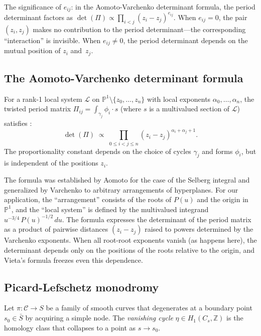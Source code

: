 \documentclass[11pt]{article}
\theoremstyle{plain}
\theoremstyle{definition}
\theoremstyle{remark}
\newcommand{\ZZ}{\mathbb{Z}}
\newcommand{\PP}{\mathbb{P}}
\begin{document}
The significance of $e_{ij}$: in the Aomoto-Varchenko determinant formula,
the period determinant factors as $\det(\Pi) \propto \prod_{i < j} (z_i - z_j)^{e_{ij}}$.
When $e_{ij} = 0$, the pair $(z_i, z_j)$ makes no contribution to the period
determinant---the corresponding ``interaction'' is invisible.  When $e_{ij} \neq 0$,
the period determinant depends on the mutual position of $z_i$ and~$z_j$.

\subsection{The Aomoto-Varchenko determinant formula}\label{subsec:av}

For a rank-1 local system $\mathcal{L}$ on $\PP^1 \setminus \{z_0, \ldots, z_n\}$
with local exponents $\alpha_0, \ldots, \alpha_n$, the twisted period matrix
$\Pi_{ij} = \int_{\gamma_j} \phi_i \cdot s$ (where $s$ is a multivalued
section of $\mathcal{L}$) satisfies \cite{aomoto,varchenko}:
\begin{equation}\label{eq:av-general}
  \det(\Pi) \;\propto\;
  \prod_{0 \leq i < j \leq n} (z_i - z_j)^{\alpha_i + \alpha_j + 1}.
\end{equation}
The proportionality constant depends on the choice of cycles $\gamma_j$ and
forms $\phi_i$, but is independent of the positions $z_i$.

The formula was established by Aomoto \cite{aomoto}
for the case of the Selberg integral and generalized by Varchenko
\cite{varchenko} to arbitrary arrangements of hyperplanes.
For our application, the ``arrangement'' consists of the roots of
$P(u)$ and the origin in $\PP^1$, and the ``local system'' is defined
by the multivalued integrand $u^{-3/4}\, P(u)^{-1/2}\,du$.
The formula expresses the determinant of the period matrix as a product
of pairwise distances $(z_i - z_j)$ raised to powers determined by
the Varchenko exponents.  When all root-root exponents vanish (as happens
here), the determinant depends only on the positions of the roots
relative to the origin, and Vieta's formula freezes even this dependence.

\subsection{Picard-Lefschetz monodromy}\label{subsec:pl}

Let $\pi: \mathcal{C} \to S$ be a family of smooth curves that degenerates
at a boundary point $s_0 \in \bar{S}$ by acquiring a simple node.
The \emph{vanishing cycle} $\eta \in H_1(C_s, \ZZ)$ is the homology class
that collapses to a point as $s \to s_0$.
\end{document}
